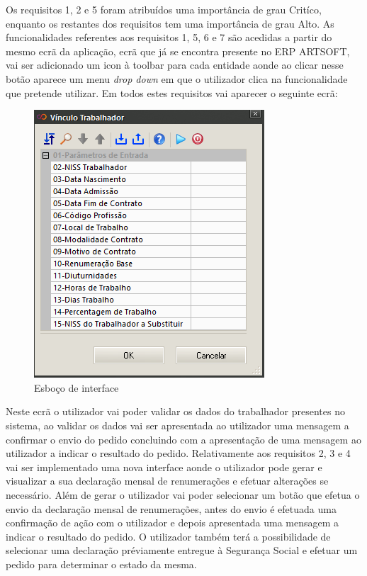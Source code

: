 \documentclass[sigplan]{acmart}
\begin{document}
Os requisitos 1, 2 e 5 foram atribuídos uma importância de grau Critíco, enquanto os restantes dos requisitos tem uma importância de grau Alto. As funcionalidades referentes aos requisitos 1, 5, 6 e 7 são acedidas a partir do mesmo ecrã da aplicação, ecrã que já se encontra presente no ERP ARTSOFT, vai ser adicionado um icon à toolbar para cada entidade aonde ao clicar nesse botão aparece um menu \textit{drop down} em que o utilizador clica na funcionalidade que pretende utilizar. Em todos estes requisitos vai aparecer o seguinte ecrã:
\begin{figure}[htbp] %
	\centerline{\includegraphics[width=\linewidth]{figures/esboco_interface.png}}
	\caption{Esboço de interface}
	\label{fig4}
\end{figure}
Neste ecrã o utilizador vai poder validar os dados do trabalhador presentes no sistema, ao validar os dados vai ser apresentada ao utilizador uma mensagem a confirmar o envio do pedido concluindo com a apresentação de uma mensagem ao utilizador a indicar o resultado do pedido. Relativamente aos requisitos 2, 3 e 4 vai ser implementado uma nova interface aonde o utilizador pode gerar e visualizar a sua declaração mensal de renumerações e efetuar alterações se necessário. Além de gerar o utilizador vai poder selecionar um botão que efetua o envio da declaração mensal de renumerações, antes do envio é efetuada uma confirmação de ação com o utilizador e depois apresentada uma mensagem a indicar o resultado do pedido. O utilizador também terá a possibilidade de selecionar uma declaração préviamente entregue à Segurança Social e efetuar um pedido para determinar o estado da mesma.
\end{document}
